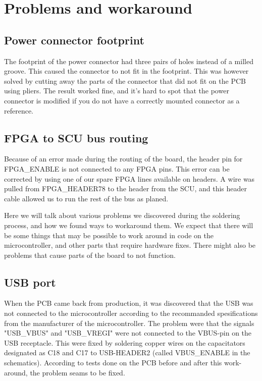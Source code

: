 \section {Problems and workaround}

\subsection{ Power connector footprint }

The footprint of the power connector had three pairs of holes instead of a milled groove.
This caused the connector to not fit in the footprint.
This was however solved by cutting away the parts of the connector that did not fit on the PCB using pliers.
The result worked fine, and it's hard to spot that the power connector is modified if you do not have a correctly mounted connector as a reference.

\subsection{ FPGA to SCU bus routing }

Because of an error made during the routing of the board, the header pin for FPGA\_ENABLE is not connected to any FPGA pins.
This error can be corrected by using one of our spare FPGA lines available on headers.
A wire was pulled from FPGA\_HEADER78 to the header from the SCU, and this header cable allowed us to run the rest of the bus as planed.



Here we will talk about various problems we discovered during the soldering process, and how we found ways to workaround them.
We expect that there will be some things that may be possible to work around in code on the microcontroller, and other parts that require hardware fixes.
There might also be problems that cause parts of the board to not function.

\subsection{ USB port }
When the PCB came back from production, it was discovered that the USB was not connected to the microcontroller
according to the recommanded spesifications from the manufacturer of the microcontroller. 
The problem were that the signals "USB_VBUS" and "USB_VREGI" were not connected to the VBUS-pin on the USB receptacle. This were fixed by soldering copper wires on the capacitators designated as C18 and C17 to USB-HEADER2 (called VBUS_ENABLE in the schematics).
According to tests done on the PCB before and after this work-around, the problem seams to be fixed.


